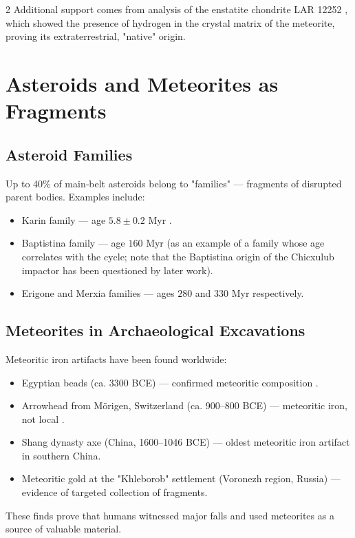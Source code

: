 \documentclass[11pt,a4paper]{article}
\begin{document}
\begin{multicols}{2}
		Additional support comes from analysis of the enstatite chondrite LAR 12252 \cite{Gardiner2025}, which showed the presence of hydrogen in the crystal matrix of the meteorite, proving its extraterrestrial, "native" origin.
		
		\section{Asteroids and Meteorites as Fragments}
		
		\subsection{Asteroid Families}
		
		Up to 40\% of main‑belt asteroids belong to "families" — fragments of disrupted parent bodies. Examples include:
		\begin{itemize}
			\item Karin family — age \(5.8 \pm 0.2\) Myr \cite{Nesvorny2002}.
			\item Baptistina family — age \(160\) Myr (as an example of a family whose age correlates with the cycle; note that the Baptistina origin of the Chicxulub impactor has been questioned by later work).
			\item Erigone and Merxia families — ages \(280\) and \(330\) Myr respectively.
		\end{itemize}
		
		\subsection{Meteorites in Archaeological Excavations}
		
		Meteoritic iron artifacts have been found worldwide:
		\begin{itemize}
			\item Egyptian beads (ca. 3300 BCE) — confirmed meteoritic composition \cite{Rehren2013}.
			\item Arrowhead from Mörigen, Switzerland (ca. 900–800 BCE) — meteoritic iron, not local \cite{Hofmann2023}.
			\item Shang dynasty axe (China, 1600–1046 BCE) — oldest meteoritic iron artifact in southern China.
			\item Meteoritic gold at the "Khleborob" settlement (Voronezh region, Russia) — evidence of targeted collection of fragments.
		\end{itemize}
		These finds prove that humans witnessed major falls and used meteorites as a source of valuable material.
		

\end{multicols}
\end{document}
